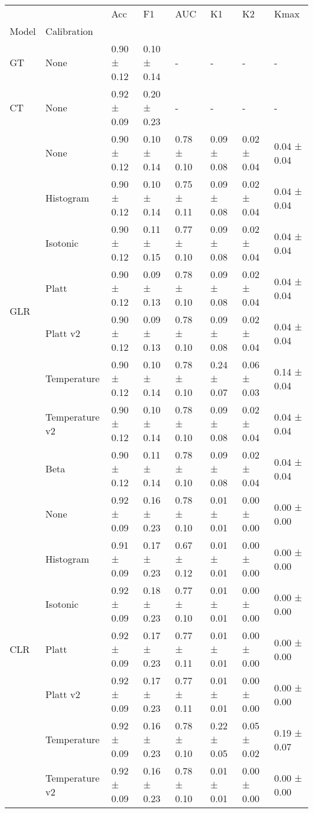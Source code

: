 \begin{tabular}{llllllll}
\toprule
 &  & Acc & F1 & AUC & K1 & K2 & Kmax \\
Model & Calibration &  &  &  &  &  &  \\
\midrule
GT & None & 0.90 ± 0.12 & 0.10 ± 0.14 & - & - & - & - \\
\cline{1-8}
CT & None & 0.92 ± 0.09 & 0.20 ± 0.23 & - & - & - & - \\
\cline{1-8}
\multirow[t]{8}{*}{GLR} & None & 0.90 ± 0.12 & 0.10 ± 0.14 & 0.78 ± 0.10 & 0.09 ± 0.08 & 0.02 ± 0.04 & 0.04 ± 0.04 \\
 & Histogram & 0.90 ± 0.12 & 0.10 ± 0.14 & 0.75 ± 0.11 & 0.09 ± 0.08 & 0.02 ± 0.04 & 0.04 ± 0.04 \\
 & Isotonic & 0.90 ± 0.12 & 0.11 ± 0.15 & 0.77 ± 0.10 & 0.09 ± 0.08 & 0.02 ± 0.04 & 0.04 ± 0.04 \\
 & Platt & 0.90 ± 0.12 & 0.09 ± 0.13 & 0.78 ± 0.10 & 0.09 ± 0.08 & 0.02 ± 0.04 & 0.04 ± 0.04 \\
 & Platt v2 & 0.90 ± 0.12 & 0.09 ± 0.13 & 0.78 ± 0.10 & 0.09 ± 0.08 & 0.02 ± 0.04 & 0.04 ± 0.04 \\
 & Temperature & 0.90 ± 0.12 & 0.10 ± 0.14 & 0.78 ± 0.10 & 0.24 ± 0.07 & 0.06 ± 0.03 & 0.14 ± 0.04 \\
 & Temperature v2 & 0.90 ± 0.12 & 0.10 ± 0.14 & 0.78 ± 0.10 & 0.09 ± 0.08 & 0.02 ± 0.04 & 0.04 ± 0.04 \\
 & Beta & 0.90 ± 0.12 & 0.11 ± 0.14 & 0.78 ± 0.10 & 0.09 ± 0.08 & 0.02 ± 0.04 & 0.04 ± 0.04 \\
\cline{1-8}
\multirow[t]{8}{*}{CLR} & None & 0.92 ± 0.09 & 0.16 ± 0.23 & 0.78 ± 0.10 & 0.01 ± 0.01 & 0.00 ± 0.00 & 0.00 ± 0.00 \\
 & Histogram & 0.91 ± 0.09 & 0.17 ± 0.23 & 0.67 ± 0.12 & 0.01 ± 0.01 & 0.00 ± 0.00 & 0.00 ± 0.00 \\
 & Isotonic & 0.92 ± 0.09 & 0.18 ± 0.23 & 0.77 ± 0.10 & 0.01 ± 0.01 & 0.00 ± 0.00 & 0.00 ± 0.00 \\
 & Platt & 0.92 ± 0.09 & 0.17 ± 0.23 & 0.77 ± 0.11 & 0.01 ± 0.01 & 0.00 ± 0.00 & 0.00 ± 0.00 \\
 & Platt v2 & 0.92 ± 0.09 & 0.17 ± 0.23 & 0.77 ± 0.11 & 0.01 ± 0.01 & 0.00 ± 0.00 & 0.00 ± 0.00 \\
 & Temperature & 0.92 ± 0.09 & 0.16 ± 0.23 & 0.78 ± 0.10 & 0.22 ± 0.05 & 0.05 ± 0.02 & 0.19 ± 0.07 \\
 & Temperature v2 & 0.92 ± 0.09 & 0.16 ± 0.23 & 0.78 ± 0.10 & 0.01 ± 0.01 & 0.00 ± 0.00 & 0.00 ± 0.00 \\

\end{tabular}
